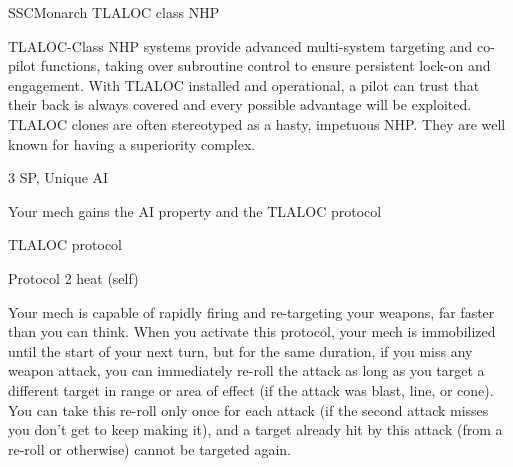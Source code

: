 \begin{mech}{SSC}{Monarch}
TLALOC class NHP

TLALOC-Class NHP systems provide advanced multi-system targeting and co-pilot functions, taking over subroutine control to ensure persistent lock-on and engagement. With TLALOC installed and operational, a pilot can trust that their back is always covered and every possible advantage will be exploited. TLALOC clones are often stereotyped as a hasty, impetuous NHP. They are well known for having a superiority complex.

3 SP, Unique
AI

Your mech gains the AI property and the TLALOC protocol

TLALOC protocol

Protocol
2 heat (self)

Your mech is capable of rapidly firing and re-targeting your weapons, far faster than you can think. When you activate this protocol, your mech is immobilized until the start of your next turn, but for the same duration, if you miss any weapon attack, you can immediately re-roll the attack as long as you target a different target in range or area of effect (if the attack was blast, line, or cone). You can take this re-roll only once for each attack (if the second attack misses you don’t get to keep making it), and a target already hit by this attack (from a re-roll or otherwise) cannot be targeted again.

\end{mech}
